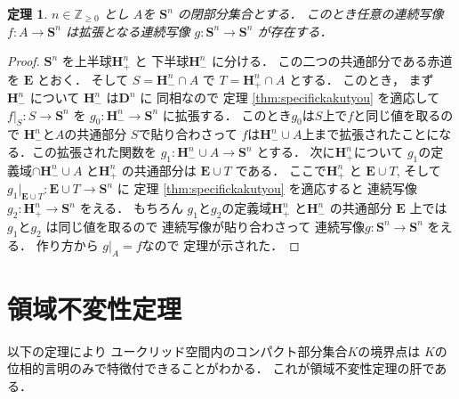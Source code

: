 \documentclass[leqno, a4paper, 12pt]{jsarticle}
\newtheorem{thm}{定理}
\newcommand{\zz}{\mathbb{Z}}
\newcommand{\mydisc}[1]{\mathbf{D}^{#1}}
\newcommand{\mysphere}[1]{\mathbf{S}^{#1}}
\newcommand{\myhemispp}[1]{\mathbf{H}_{+}^{#1}}
\newcommand{\myhemispm}[1]{\mathbf{H}_{-}^{#1}}
\newcommand{\myeqsp}{\mathbf{E}}
\begin{document}
\begin{thm}\label{thm:26thismainthm}
$n\in \zz_{\ge 0}$
とし
$A$を
$\mysphere{n}$
の閉部分集合とする．
このとき任意の連続写像
$f\colon A\to \mysphere{n}$
は拡張となる連続写像
$g\colon \mysphere{n}\to \mysphere{n}$
が存在する．
\end{thm}
\begin{proof}
$\mysphere{n}$
を上半球$\myhemispp{n}$
と
下半球$\myhemispm{n}$
に分ける．
この二つの共通部分である赤道を
$\myeqsp$
とおく．
そして
$S=\myhemispm{n}\cap A$
で
$T=\myhemispp{n}\cap A$
とする．
このとき，
まず
$\myhemispm{n}$
について
$\myhemispm{n}$
は$\mydisc{n}$
に
同相なので
定理
\ref{thm:specifickakutyou}
を適応して
$f|_{S}\colon S\to \mysphere{n}$
を
$g_{0}\colon \myhemispm{n}\to \mysphere{n}$
に拡張する．
このとき$g_{0}$は$S$上で$f$と同じ値を取るので
$\myhemispm{n}$と$A$の共通部分
$S$で貼り合わさって
$f$は$\myhemispm{n}\cup A$上まで拡張されたことになる．この拡張された関数を
$g_{1}\colon \myhemispm{n}\cup A\to \mysphere{n}$
とする．
次に$\myhemispp{n}$について
$g_{1}$の定義域$\cap \myhemispm{n}\cup A$
と$\myhemispp{n}$
の共通部分は
$\myeqsp\cup T$
である．
ここで$\myhemispp{n}$
と
$\myeqsp\cup T$, 
そして
$g_{1}|_{\myeqsp\cup T}\colon \myeqsp\cup T\to \mysphere{n}$
に
定理
\ref{thm:specifickakutyou}
を適応すると
連続写像
$g_{2}\colon \myhemispp{n}\to \mysphere{n}$
をえる．
もちろん
$g_{1}$と$g_{2}$の定義域$\myhemispp{n}$
と$\myhemispm{n}$
の共通部分
$\myeqsp$
上では$g_{1}$と$g_{2}$
は同じ値を取るので
連続写像が貼り合わさって
連続写像$g\colon \mysphere{n}\to \mysphere{n}$
をえる．
作り方から
$g|_{A}=f$なので
定理が示された．
\end{proof}


\section{領域不変性定理}

以下の定理により
ユークリッド空間内のコンパクト部分集合$K$の境界点は
$K$の位相的言明のみで特徴付できることがわかる．
これが領域不変性定理の肝である．
\end{document}
